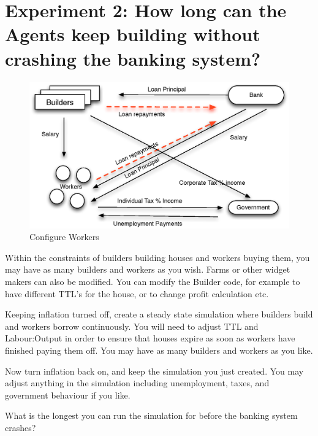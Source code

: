 \documentclass{article}
\begin{document}
\section{Experiment 2: How long can the Agents keep building without crashing
the banking system?}
\begin{figure}[h]
\begin{center}
\includegraphics[width=12cm]{builder-exp.eps}
\caption{Configure Workers}
\end{center}
\end{figure}
Within the constraints of builders building houses and workers
buying them, you may have as many builders and workers as you
wish. Farms or other widget makers can also be modified. You can modify the Builder code, for example to have
different TTL's for the house, or to change profit calculation etc.

Keeping inflation turned off, create a steady state simulation
where builders build and workers borrow continuously. You will
need to adjust TTL and Labour:Output in order to ensure that houses
expire as soon as workers have finished paying them off. You may
have as many builders and workers as you like.

Now turn inflation back on, and keep the simulation you just created. 
You may adjust anything in the simulation
including unemployment, taxes, and government behaviour if you like.

\vspace{0.5cm}

What is the longest you can run the simulation for before the banking
system crashes?
\end{document}
